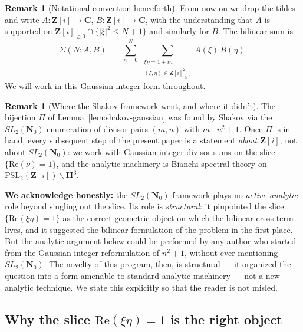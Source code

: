 \documentclass[11pt]{article}
\theoremstyle{definition}
\newtheorem{remark}[theorem]{Remark}
\newcommand{\Nz}{\mathbf{N}_0}
\newcommand{\Z}{\mathbf{Z}}
\newcommand{\C}{\mathbf{C}}
\newcommand{\HH}{\mathbf{H}}
\newcommand{\Zi}{\Z[i]}
\newcommand{\SLNz}{SL_2(\Nz)}
\renewcommand{\Re}{\mathrm{Re}}
\begin{document}
\begin{remark}[Notational convention henceforth]\label{rmk:notation}
From now on we drop the tildes and write $A:\Zi\to\C$, $B:\Zi\to\C$, with the understanding that $A$ is supported on $\Zi_{\ge 0}\cap\{|\xi|^2\le N+1\}$ and similarly for $B$. The bilinear sum is
\[
\Sigma(N;A,B)\;=\;\sum_{n=0}^N\,\sum_{\substack{\xi\eta=1+in\\(\xi,\eta)\in\Zi_{\ge 0}^2}}A(\xi)\,B(\eta).
\]
We will work in this Gaussian-integer form throughout.
\end{remark}

\begin{remark}[Where the Shakov framework went, and where it didn't]\label{rmk:shakov-honest}
The bijection $\Pi$ of Lemma~\ref{lem:shakov-gaussian} was found by Shakov \cite{shakov} via the $\SLNz$ enumeration of divisor pairs $(m,n)$ with $m\mid n^2+1$. Once $\Pi$ is in hand, every subsequent step of the present paper is a statement \emph{about $\Zi$}, not about $\SLNz$: we work with Gaussian-integer divisor sums on the slice $\{\Re(\nu)=1\}$, and the analytic machinery is Bianchi spectral theory on $\mathrm{PSL}_2(\Zi)\backslash\HH^3$.

\textbf{We acknowledge honestly:} the $\SLNz$ framework plays no \emph{active analytic} role beyond singling out the slice. Its role is \emph{structural}: it pinpointed the slice $\{\Re(\xi\eta)=1\}$ as the correct geometric object on which the bilinear cross-term lives, and it suggested the bilinear formulation of the problem in the first place. But the analytic argument below could be performed by any author who started from the Gaussian-integer reformulation of $n^2+1$, without ever mentioning $\SLNz$. The novelty of this program, then, is structural --- it organized the question into a form amenable to standard analytic machinery --- not a new analytic technique. We state this explicitly so that the reader is not misled.
\end{remark}

\subsection{Why the slice $\Re(\xi\eta)=1$ is the right object}\label{ssec:setup-slice}
\end{document}
